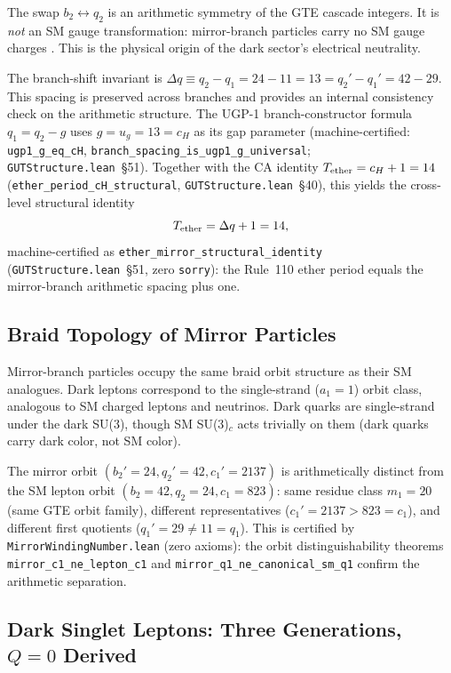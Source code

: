 \documentclass[11pt]{article}
\begin{document}
The swap $b_2 \leftrightarrow q_2$ is an arithmetic symmetry of the GTE cascade integers.
It is \emph{not} an SM gauge transformation: mirror-branch particles carry no SM gauge
charges \cite{SpivackBraidAtlas}. This is the physical origin of the dark sector's
electrical neutrality.

The branch-shift invariant is $\Delta q \equiv q_2 - q_1 = 24 - 11 = 13 = q_2' - q_1' =
42 - 29$. This spacing is preserved across branches and provides an internal consistency
check on the arithmetic structure.
The UGP-1 branch-constructor formula $q_1 = q_2 - g$ uses $g = u_g = 13 = c_H$ as its gap parameter (machine-certified: \texttt{ugp1\_g\_eq\_cH}, \texttt{branch\_spacing\_is\_ugp1\_g\_universal}; \texttt{GUTStructure.lean}~\S51).
Together with the CA identity $T_{\rm ether} = c_H + 1 = 14$ (\texttt{ether\_period\_cH\_structural}, \texttt{GUTStructure.lean}~\S40), this yields the cross-level structural identity
\[
  T_{\rm ether} = \Delta q + 1 = 14,
\]
machine-certified as \texttt{ether\_mirror\_structural\_identity} (\texttt{GUTStructure.lean}~\S51, zero \texttt{sorry}): the Rule~110 ether period equals the mirror-branch arithmetic spacing plus one.

\subsection{Braid Topology of Mirror Particles}
\label{ssec:braid_topology}

Mirror-branch particles occupy the same braid orbit structure as their SM analogues.
Dark leptons correspond to the single-strand ($a_1 = 1$) orbit class, analogous to SM
charged leptons and neutrinos. Dark quarks are single-strand under the dark SU(3), though
SM SU(3)$_c$ acts trivially on them (dark quarks carry dark color, not SM color).

The mirror orbit $(b_2'=24, q_2'=42, c_1'=2137)$ is arithmetically distinct from the SM
lepton orbit $(b_2=42, q_2=24, c_1=823)$: same residue class $m_1=20$ (same GTE orbit
family), different representatives ($c_1'=2137 > 823 = c_1$), and different first
quotients ($q_1'=29 \neq 11 = q_1$). This is certified by
\texttt{MirrorWindingNumber.lean} (zero axioms): the orbit distinguishability theorems
\texttt{mirror\_c1\_ne\_lepton\_c1} and \texttt{mirror\_q1\_ne\_canonical\_sm\_q1}
confirm the arithmetic separation.

\subsection{Dark Singlet Leptons: Three Generations, $Q=0$ Derived}
\label{ssec:dark_leptons}
\end{document}
